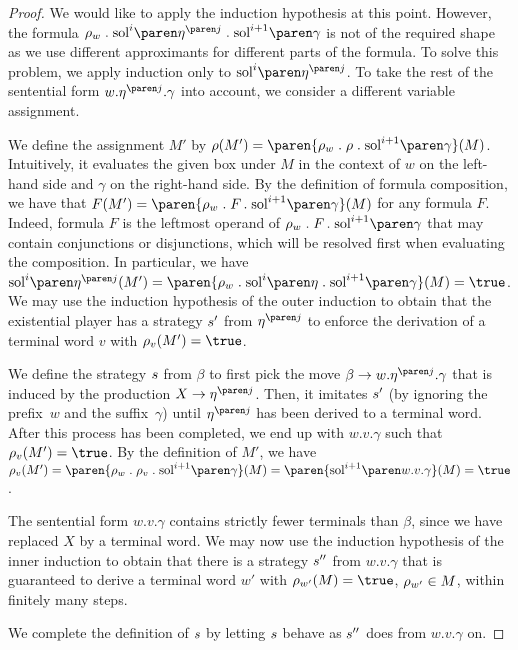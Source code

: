 \documentclass[../../diss.tex]{subfiles}
\begin{document}
\begin{proof}
    We would like to apply the induction hypothesis at this point.
    However, the formula $\tbox{w} \comp \sol{i}{\itr{\eta}{j}} \comp \sol{i+1}{\gamma}$ is not of the required shape as we use different approximants for different parts of the formula.
    To solve this problem, we apply induction only to $\sol{i}{\itr{\eta}{j}}$.
    To take the rest of the sentential form $w.\itr{\eta}{j}.\gamma$ into account, we consider a different variable assignment.

    We define the assignment $M'$ by $\tbox(M') = \paren{\tbox{w} \comp \tbox \comp \sol{i+1}{\gamma}}(M)$.
    Intuitively, it evaluates the given box under $M$ in the context of $w$ on the left-hand side and $\gamma$ on the right-hand side.
    By the definition of formula composition, we have that $F(M') = \paren{\tbox{w} \comp F \comp \sol{i+1}{\gamma}}(M)$ for any formula $F$.
    Indeed, formula $F$ is the leftmost operand of $\tbox{w} \comp F \comp \sol{i+1}{\gamma}$ that may contain conjunctions or disjunctions, which will be resolved first when evaluating the composition.
    In particular, we have $\sol{i}{\itr{\eta}{j}}(M') = \paren{\tbox{w} \comp \sol{i}{\eta} \comp \sol{i+1}{\gamma}}(M) = \true$.
    We may use the induction hypothesis of the outer induction to obtain that the existential player has a strategy $s'$ from $\itr{\eta}{j}$ to enforce the derivation of a terminal word $v$ with $\tbox{v}(M') = \true$.

    We define the strategy $s$ from $\beta$ to first pick the move $\beta \to w.\itr{\eta}{j}.\gamma$ that is induced by the production $X \to \itr{\eta}{j}$.
    Then, it imitates $s'$ (by ignoring the prefix~$w$ and the suffix~$\gamma$) until $\itr{\eta}{j}$ has been derived to a terminal word.
    After this process has been completed, we end up with $w.v.\gamma$ such that $\tbox{v}(M') = \true$.
    By the definition of $M'$, we have $\tbox{v}(M') = \paren{\tbox{w} \comp \tbox{v} \comp \sol{i+1}{\gamma}}(M) = \paren{\sol{i+1}{w.v.\gamma}}(M) = \true$.

    The sentential form $w.v.\gamma$ contains strictly fewer terminals than $\beta$, since we have replaced $X$ by a terminal word.
    We may now use the induction hypothesis of the inner induction to obtain that there is a strategy $s''$ from $w.v.\gamma$ that is guaranteed to derive a terminal word $w'$ with $\tbox{w'}(M) = \true$, \ie $\tbox{w'} \in M$, within finitely many steps.

    We complete the definition of $s$ by letting $s$ behave as $s''$ does from $w.v.\gamma$ on.


\end{proof}
\end{document}
